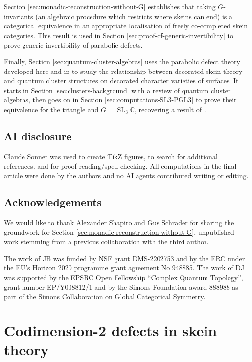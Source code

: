 \documentclass[a4paper]{article}
\numberwithin{equation}{section}
\newcommand{\1}{{\mathrm{1}\mkern-4mu{\mathchoice{}{}{\mskip-0.5mu}{\mskip-1mu}}\mathrm{l}}}
\newcommand{\CC}{\mathbb{C}}
\DeclareMathOperator{\SL}{SL}
\begin{document}
Section \ref{sec:monadic-reconstruction-without-G} establishes that taking $G$-invariants (an algebraic procedure which restricts where skeins can end) is a categorical equivalence in an appropriate localisation of freely co-completed skein categories. This result is used in Section \ref{sec:proof-of-generic-invertibility} to prove generic invertibility of parabolic defects.


Finally, Section \ref{sec:quantum-cluster-algebras} uses the parabolic defect theory developed here and in \cite{Brown_Jordan_2025} to study the relationship between decorated skein theory and quantum cluster structures on decorated character varieties of surfaces.
It starts in Section \ref{sec:clusters-background} with a review of quantum cluster algebras, then goes on in Section \ref{sec:computations-SL3-PGL3} to prove their equivalence for the triangle and $G=\SL_3\CC$, recovering a result of \cite{IY22}.


\subsection{AI disclosure}\label{sec:AI-disclosure}

Claude Sonnet was used to create TikZ figures, to search for additional references, and for proof-reading/spell-checking. All computations in the final article were done by the authors and no AI agents contributed writing or editing.

\subsection{Acknowledgements}\label{sec:acknowledgements}
We would like to thank Alexander Shapiro and Gus Schrader for sharing the groundwork for Section \ref{sec:monadic-reconstruction-without-G}, unpublished work stemming from a previous collaboration with the third author.

The work of JB was funded by NSF grant DMS-2202753 and by the ERC under the EU's Horizon 2020 programme grant agreement No 948885.
The work of DJ was supported by the EPSRC Open Fellowship “Complex Quantum Topology”, grant number EP/Y008812/1 and by the Simons Foundation award 888988 as part of the Simons Collaboration on Global Categorical Symmetry.

\section{Codimension-2 defects in skein theory}\label{sec:defects}
\end{document}

